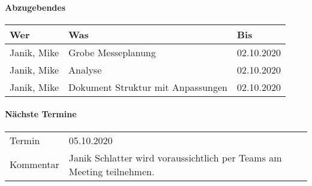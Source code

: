 \paragraph{Abzugebendes}
\begin{tabbing}
	\begin{tabu} to \linewidth {l X l }
        \toprule
        \textbf{Wer} & \textbf{Was} & \textbf{Bis} \\
		\midrule
		Janik, Mike & Grobe Messeplanung & 02.10.2020 \\
		Janik, Mike & Analyse & 02.10.2020 \\
		Janik, Mike & Dokument Struktur mit Anpassungen & 02.10.2020 \\
		\bottomrule
    \end{tabu}
\end{tabbing}

\paragraph{Nächste Termine} \hfill
\begin{table}[h!]
	\begin{tabularx}{\textwidth}{l X }
		Termin & 05.10.2020 \\
		Kommentar & Janik Schlatter wird voraussichtlich per Teams am Meeting teilnehmen. \\
	\end{tabularx}
\end{table}

\clearpage